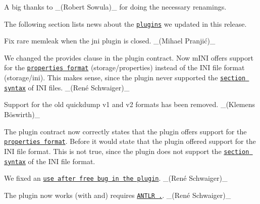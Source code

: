 A big thanks to \+\_\+(\+Robert Sowula)\+\_\+ for doing the necessary renamings.

The following section lists news about the \href{https://www.libelektra.org/plugins/readme}{\tt plugins} we updated in this release.


\begin{DoxyItemize}
\item Fix rare memleak when the {\ttfamily jni} plugin is closed. \+\_\+(Mihael Pranjić)\+\_\+
\end{DoxyItemize}


\begin{DoxyItemize}
\item We changed the {\ttfamily provides} clause in the plugin contract. Now m\+I\+NI offers support for the \href{https://en.wikipedia.org/wiki/.properties}{\tt properties format} ({\ttfamily storage/properties}) instead of the I\+NI file format ({\ttfamily storage/ini}). This makes sense, since the plugin never supported the \href{https://en.m.wikipedia.org/wiki/INI_file#Sections}{\tt section syntax} of I\+NI files. \+\_\+(René Schwaiger)\+\_\+
\end{DoxyItemize}


\begin{DoxyItemize}
\item Support for the old quickdump v1 and v2 formats has been removed. \+\_\+(Klemens Böswirth)\+\_\+
\end{DoxyItemize}


\begin{DoxyItemize}
\item The plugin contract now correctly states that the plugin offers support for the \href{https://en.wikipedia.org/wiki/.properties}{\tt properties format}. Before it would state that the plugin offered support for the I\+NI file format. This is not true, since the plugin does not support the \href{https://en.m.wikipedia.org/wiki/INI_file#Sections}{\tt section syntax} of the I\+NI file format.
\end{DoxyItemize}


\begin{DoxyItemize}
\item We fixed an \href{https://issues.libelektra.org/3561}{\tt use after free bug in the plugin}. \+\_\+(René Schwaiger)\+\_\+
\end{DoxyItemize}


\begin{DoxyItemize}
\item The plugin now works (with and) requires \href{https://github.com/antlr/antlr4/releases/tag/4.9}{\tt A\+N\+T\+LR {.}}. \+\_\+(René Schwaiger)\+\_\+
\end{DoxyItemize}

